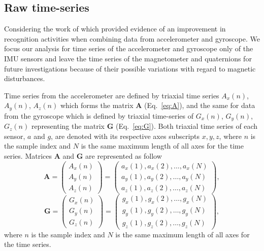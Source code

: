 \subsection{Raw time-series}
Considering the work of \cite{shoaib2016} which provided evidence 
of an improvement in recognition activities when combining data 
from accelerometer and gyroscope.
We focus our analysis for time series of the accelerometer and gyroscope only
of the IMU sensors and leave the time series of the magnetometer and 
quaternions for future investigations because of their possible variations 
with regard to magnetic disturbances.

Time series from the accelerometer are defined by triaxial time series 
$A_x(n)$, $A_y(n)$, $A_z(n)$ which forms the matrix $\boldsymbol{A}$ 
(Eq.~\ref{eq:A}), and the same for data from the gyroscope which is 
defined by triaxial time-series of $G_x(n)$, $G_y(n)$, $G_z(n)$ representing 
the matrix $\boldsymbol{G}$ (Eq.~\ref{eq:G}). Both triaxial time series of 
each sensor, $a$ and $g$, are denoted with its respective axes 
subscripts $x,y,z$, where $n$ is the sample index  and $N$ is the same 
maximum length of all axes for the time series.
Matrices  $\boldsymbol{A}$ and $\boldsymbol{G}$ are represented as follow
\begin{equation}\label{eq:A}
\boldsymbol{A} =
\begin{pmatrix}
  A_x(n) \\
  A_y(n) \\
  A_z(n)
\end{pmatrix}
=
\begin{pmatrix}
 a_x(1),a_x(2),\dots,a_x(N) \\
 a_y(1),a_y(2),\dots,a_y(N) \\
 a_z(1),a_z(2),\dots,a_z(N) 
\end{pmatrix},
\end{equation}
\begin{equation}\label{eq:G}
\boldsymbol{G} =
\begin{pmatrix}
 G_x(n) \\
 G_y(n) \\
 G_z(n)
\end{pmatrix}
=
\begin{pmatrix}
 g_x(1),g_x(2),\dots,g_x(N) \\
 g_y(1),g_y(2),\dots,g_y(N) \\
 g_z(1),g_z(2),\dots,g_z(N) 
\end{pmatrix},
\end{equation}
where $n$ is the sample index  and $N$ is the same maximum length of all axes 
for the time series.



